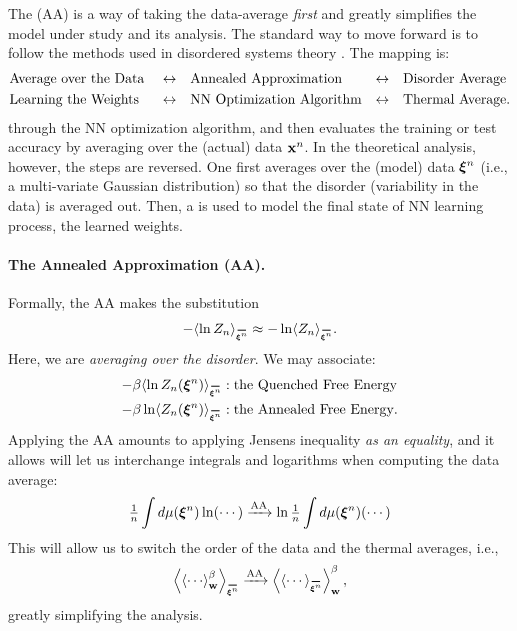 The \AnnealedApproximation (AA) is a way of taking the data-average \emph{first} and greatly
simplifies the model under study and its analysis.  The standard way to move forward is to follow the methods used
in disordered systems theory \cite{SST92, EB01_BOOK}.
The mapping is:
\begin{align*}
  &\mbox{Average over the Data }&\leftrightarrow& \quad\mbox{Annealed Approximation}    &\leftrightarrow& \quad\mbox{Disorder Average} \\
  &\mbox{Learning the Weights }      &\leftrightarrow& \quad\mbox{NN Optimization Algorithm} &\leftrightarrow& \quad\mbox{Thermal Average}  .
\end{align*}
  through the NN optimization algorithm,
  and then evaluates the training or test accuracy
  by averaging over the (actual) data $\mathbf{x}^{n}$.
  In the theoretical analysis, however, the steps are reversed.
  One first averages over the (model) data $\boldsymbol{\xi}^{n}$ (i.e., a multi-variate Gaussian distribution)
  so that the disorder (variability in the data) is averaged out.
  Then, a \ThermalAverage is used to model the final state of NN learning process, the learned weights.

\paragraph{The Annealed Approximation (AA).} 
Formally, the AA makes the substitution
\begin{align}
\label{eqn:AA}
-\langle\ln Z_{\ND}\rangle_{\AVGNDXIn}\approx-\ln \langle Z_{\ND}\rangle_{\AVGNDXIn}.
\end{align}
Here, we are \emph{averaging over the disorder}.
We may associate: 
\begin{eqnarray*}
    -\beta\langle\ln Z_{\ND}(\NDXIn)\rangle_{\AVGNDXIn} &: \mbox{the \Quenched \FreeEnergy} \\
    -\beta\ln \langle Z_{\ND}(\NDXIn)\rangle_{\AVGNDXIn} &: \mbox{the \Annealed \FreeEnergy}.
\end{eqnarray*}
Applying the AA amounts to applying Jensens inequality \emph{as an equality}, 
and it allows will let us interchange integrals and logarithms when computing the data average:
\begin{align}
\label{eqn:Jensens}
\tfrac{1}{n}\int d\mu(\boldsymbol{\xi}^{n})\ln(\cdots)   
\xrightarrow {\text{AA}}
\ln\tfrac{1}{n}\int d\mu(\boldsymbol{\xi}^{n})(\cdots)
\end{align}
This will allow us to switch the order of the data and the thermal averages, i.e.,
\begin{align}
\label{eqn:switch}
\left\langle \THRMAVGw{\cdots} \right\rangle_{\AVGNDXIn}
\xrightarrow{\text{AA}}
\THRMAVGw{\left\langle \cdots \right\rangle_{\AVGNDXIn}},
\end{align}
greatly simplifying the analysis.

